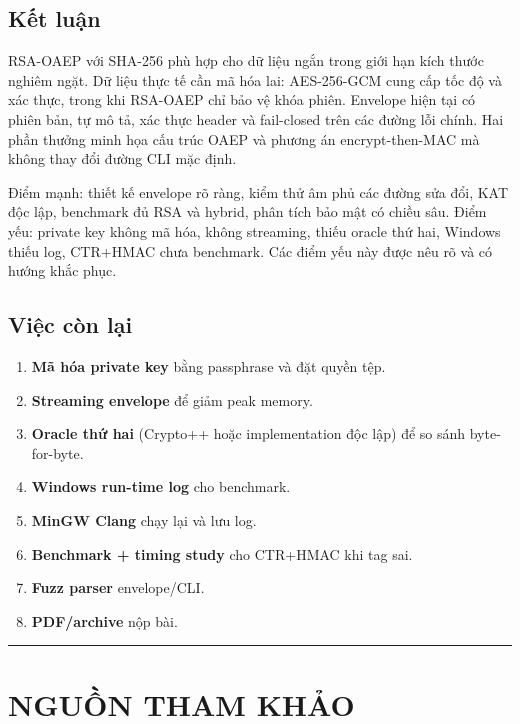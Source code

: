 \documentclass[12pt,a4paper,oneside]{report}
\begin{document}
\section{Kết luận}


RSA-OAEP với SHA-256 phù hợp cho dữ liệu ngắn trong giới hạn kích thước nghiêm ngặt. Dữ liệu thực tế cần mã hóa lai: AES-256-GCM cung cấp tốc độ và xác thực, trong khi RSA-OAEP chỉ bảo vệ khóa phiên. Envelope hiện tại có phiên bản, tự mô tả, xác thực header và fail-closed trên các đường lỗi chính. Hai phần thưởng minh họa cấu trúc OAEP và phương án encrypt-then-MAC mà không thay đổi đường CLI mặc định.


Điểm mạnh: thiết kế envelope rõ ràng, kiểm thử âm phủ các đường sửa đổi, KAT độc lập, benchmark đủ RSA và hybrid, phân tích bảo mật có chiều sâu. Điểm yếu: private key không mã hóa, không streaming, thiếu oracle thứ hai, Windows thiếu log, CTR+HMAC chưa benchmark. Các điểm yếu này được nêu rõ và có hướng khắc phục.


\section{Việc còn lại}


\begin{enumerate}[leftmargin=*]
\item \textbf{Mã hóa private key} bằng passphrase và đặt quyền tệp.
\item \textbf{Streaming envelope} để giảm peak memory.
\item \textbf{Oracle thứ hai} (Crypto++ hoặc implementation độc lập) để so sánh byte-for-byte.
\item \textbf{Windows run-time log} cho benchmark.
\item \textbf{MinGW Clang} chạy lại và lưu log.
\item \textbf{Benchmark + timing study} cho CTR+HMAC khi tag sai.
\item \textbf{Fuzz parser} envelope/CLI.
\item \textbf{PDF/archive} nộp bài.
\end{enumerate}


\par\noindent\rule{\textwidth}{0.4pt}


\chapter{NGUỒN THAM KHẢO}
\end{document}
